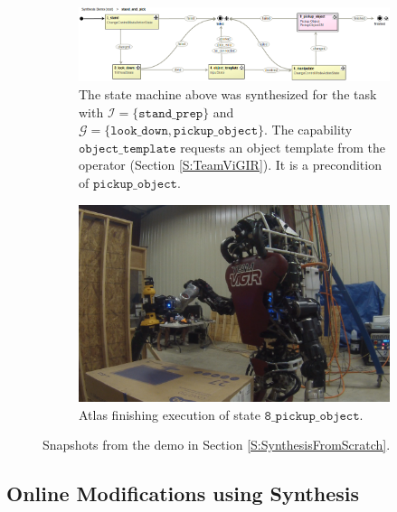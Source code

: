 \begin{figure}[t]
	\centering
	\begin{subfigure}[b]{0.99\columnwidth}
	\includegraphics[width=0.99\columnwidth,clip]{./img/stand_and_pick_sm.png}
	\caption{
	The state machine above was synthesized for the task with $\mathcal{I} = \{ \mathtt{stand\_prep} \}$ and $\mathcal{G} = \{ \mathtt{look\_down}, \mathtt{pickup\_object} \}$.
	The capability $\mathtt{object\_template}$ requests an object template from the operator (Section \ref{S:TeamViGIR}).
	It is a precondition of $\mathtt{pickup\_object}$.
	}
	\label{Fig:stand_and_pick_sm}
	\end{subfigure}
	
	\vspace{4 pt}
	\begin{subfigure}[b]{0.95\columnwidth}
	\includegraphics[width=0.99\columnwidth, clip]{./img/stand_and_pick_gopro.png}
	\caption{Atlas finishing execution of state $\mathtt{8\_pickup\_object}$.
	} 
	\label{Fig:stand_and_pick_gopro}
	\end{subfigure}
	\caption{
	Snapshots from the demo in Section \ref{S:SynthesisFromScratch}.
	}
	\label{Fig:stand_and_pick_demo}
	\vspace{-10 pt}
\end{figure}

\subsection{Online Modifications using Synthesis}\label{S:RuntimeSynthesis}

